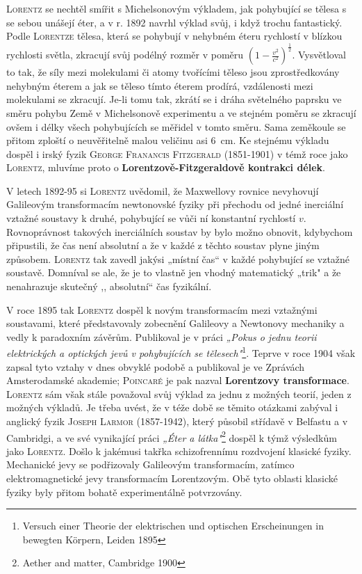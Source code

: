       \textsc{Lorentz} se nechtěl smířit s Michelsonovým výkladem, jak pohybující se tělesa s se
      sebou unášejí éter, a v r. 1892 navrhl výklad  svůj, i když trochu fantastický. Podle
      \textsc{Lorentze} tělesa, která se pohybují v nehybném éteru rychlostí v blízkou rychlosti
      světla, zkracují svůj podélný rozměr v poměru \((1- \frac{v^2}{c^2})^\frac{1}{2}\).
      Vysvětloval to tak, že síly mezi molekulami či atomy tvořícími těleso jsou zprostředkovány
      nehybným éterem a jak se těleso tímto éterem prodírá, vzdálenosti mezi molekulami se zkracují.
      Je-li tomu tak, zkrátí se i dráha světelného paprsku ve směru pohybu Země v Michelsonově
      experimentu a ve stejném poměru se zkracují ovšem i délky všech pohybujících se měřidel v
      tomto směru. Sama zeměkoule se přitom zploští o neuvěřitelně malou veličinu asi \SI{6}{\cm}.
      Ke stejnému výkladu dospěl i irský fyzik \textsc{George Franancis Fitzgerald} (1851-1901) v
      témž roce jako \textsc{Lorentz}, mluvíme proto o \textbf{Lorentzově-Fitzgeraldově kontrakci
      délek}.

      V letech 1892-95 si \textsc{Lorentz} uvědomil, že Maxwellovy rovnice nevyhovují Galileovým
      transformacím newtonovské fyziky při přechodu od jedné inerciální vztažné soustavy k druhé,
      pohybující se vůči ní konstantní rychlostí \(v\). Rovnoprávnost takových inerciálních soustav
      by bylo možno obnovit, kdybychom připustili, že čas není absolutní a že v každé z těchto
      soustav plyne jiným způsobem. \textsc{Lorentz} tak zavedl jakýsi „místní čas“ v každé
      pohybující se vztažné soustavě. Domníval se ale, že je to vlastně jen vhodný matematický
      „trik" a že nenahrazuje skutečný ,, absolutní“ čas fyzikální. 

      V roce 1895 tak \textsc{Lorentz} dospěl k novým transformacím mezi vztažnými soustavami, které
      představovaly zobecnění Galileovy a Newtonovy mechaniky a vedly k paradoxním závěrům.
      Publikoval je v práci \emph{„Pokus o jednu teorii elektrických a optických jevů v pohybujících
      se tělesech"}\footnote{Versuch einer Theorie der elektrischen und optischen Erscheinungen in
      bewegten Körpern, Leiden 1895}. Teprve v roce 1904 však zapsal tyto vztahy v dnes obvyklé
      podobě a publikoval je ve Zprávách Amsterodamské akademie; \textsc{Poincaré} je pak nazval
      \textbf{Lorentzovy transformace}. \textsc{Lorentz} sám však stále považoval svůj výklad za
      jednu z možných teorií, jeden z možných výkladů. Je třeba uvést, že v téže době se těmito
      otázkami zabýval i anglický fyzik \textsc{Joseph Larmor} (1857-1942), který působil střídavě v
      Belfastu a v Cambridgi, a ve své vynikající práci \emph{„Éter a látka"}\footnote{Aether and
      matter, Cambridge 1900} dospěl k týmž výsledkům jako \textsc{Lorentz}. Došlo k jakémusi takřka
      schizofrennímu rozdvojení klasické fyziky. Mechanické jevy se podřizovaly Galileovým
      transformacím, zatímco elektromagnetické jevy transformacím Lorentzovým. Obě tyto oblasti
      klasické fyziky byly přitom bohatě experimentálně potvrzovány.

